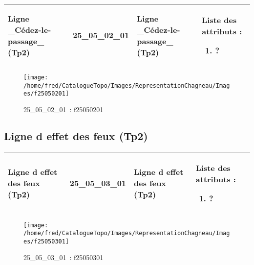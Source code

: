 \documentclass[12pt,titlepage]{book}
\begin{document}
\renewcommand{\arraystretch}{1.2}
\begin{supertabular}{|p{10cm}|c|p{13cm}|p{12cm}|}
 Ligne \_Cédez-le-passage\_ (Tp2) & 25\_05\_02\_01 & Ligne \_Cédez-le-passage\_ (Tp2) & Liste des attributs :
\begin{enumerate}
  \item ?\end{enumerate}
\\
\hline
\end{supertabular}
\begin{figure}[h!]
  \hfill         %
  \begin{minipage}[t]{3cm}
    \begin{center}
      \texttt{[image: /home/fred/CatalogueTopo/Images/RepresentationChagneau/Images/f25050201]}
      \caption[~25\_05\_02\_01]{\small{25\_05\_02\_01~:} \tiny{f25050201}}\label{f25050201}
    \end{center}
  \end{minipage}
\end{figure}


\subsection{Ligne d effet des feux (Tp2)}
\noindent
\vspace{\baselineskip}

\renewcommand{\arraystretch}{1.2}
\begin{supertabular}{|p{10cm}|c|p{13cm}|p{12cm}|}
 Ligne d effet des feux (Tp2) & 25\_05\_03\_01 & Ligne d effet des feux (Tp2) & Liste des attributs :
\begin{enumerate}
  \item ?\end{enumerate}
\\
\hline
\end{supertabular}
\begin{figure}[h!]
  \hfill         %
  \begin{minipage}[t]{3cm}
    \begin{center}
      \texttt{[image: /home/fred/CatalogueTopo/Images/RepresentationChagneau/Images/f25050301]}
      \caption[~25\_05\_03\_01]{\small{25\_05\_03\_01~:} \tiny{f25050301}}\label{f25050301}
    \end{center}
  \end{minipage}
\end{figure}
\end{document}
